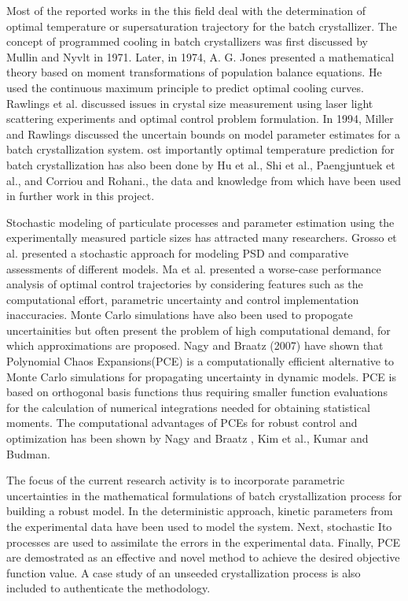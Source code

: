 \documentclass[3p,times]{elsarticle}
\begin{document}
Most of the reported works in the this field deal with the determination of optimal temperature or supersaturation trajectory for the batch crystallizer. The concept of programmed cooling in batch crystallizers was first discussed by Mullin and Nyvlt \cite{mullin} in 1971.
Later, in 1974, A. G. Jones \cite{agjones} presented a mathematical theory based on moment transformations of population balance equations. He used the continuous maximum principle to predict optimal cooling curves.
Rawlings et al. \cite{rawlings} discussed issues in crystal size measurement using laser light scattering experiments and optimal control problem formulation. In 1994, Miller and Rawlings \cite{miller_rawlings}  discussed the uncertain bounds on model parameter estimates for a batch crystallization system. 
ost importantly optimal temperature prediction for batch crystallization has also been done by Hu et al., Shi et al.\cite{shi}, Paengjuntuek et al.\cite{paeng}, and Corriou and Rohani.\cite{corriou}, the data and knowledge from which have been used in further work in this project.\par
Stochastic modeling of particulate processes and parameter estimation using the experimentally measured particle sizes has attracted many researchers. Grosso et al.\cite{grosso} presented a stochastic approach for modeling PSD and comparative assessments of different models. Ma et al.\cite{ma} presented a worse-case performance analysis of optimal control trajectories by considering features such as the computational effort, parametric uncertainty and control implementation inaccuracies. Monte Carlo simulations have also been used to propogate uncertainities but often present the problem of high computational demand, for which approximations are proposed.  Nagy and Braatz (2007) \cite{nagy} have shown that Polynomial Chaos Expansions(PCE) is a computationally efficient alternative to Monte Carlo simulations for propagating uncertainty in dynamic models. PCE is based on orthogonal basis functions thus requiring smaller function evaluations for the calculation of numerical integrations needed for obtaining statistical moments. The computational advantages of PCEs for robust control and optimization has been shown by Nagy and Braatz \cite{nagy}, Kim et al.\cite{kim}, Kumar and Budman\cite{kumar}. \par
The focus of the current research activity is to incorporate parametric uncertainties in the mathematical formulations of batch crystallization process for building a robust model. In the deterministic approach, kinetic parameters from the experimental data have been used to model the system. Next, stochastic Ito processes are used to assimilate the errors in the experimental data. Finally, PCE are demostrated as an effective and novel method to achieve the desired objective function value. A case study of an unseeded crystallization process is also included to authenticate the methodology.
\end{document}
